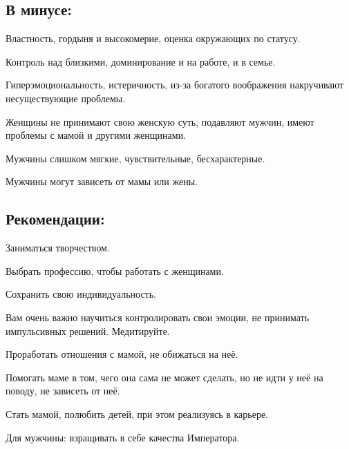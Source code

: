 \endsubsection

\subsection{В минусе:}
\item Властность, гордыня и высокомерие, оценка окружающих по статусу.                                      
\item Контроль над близкими, доминирование и на работе, и в семье.                                          
\item Гиперэмоциональность, истеричность, из-за богатого воображения накручивают несуществующие проблемы.   
\item Женщины не принимают свою женскую суть, подавляют мужчин, имеют проблемы с мамой и другими женщинами. 
\item Мужчины слишком мягкие, чувствительные, бесхарактерные.                                                
\item Мужчины могут зависеть от мамы или жены.                                                              
\endsubsection

\subsection{Рекомендации:}
\item Заниматься творчеством.                                                                                
\item Выбрать профессию, чтобы работать с женщинами.                                                        
\item Сохранить свою индивидуальность.                                                                      
\item Вам очень важно научиться контролировать свои эмоции, не принимать импульсивных решений. Медитируйте. 
\item Проработать отношения с мамой, не обижаться на неё.                                                    
\item Помогать маме в том, чего она сама не может сделать, но не идти у неё на поводу, не зависеть от неё. 
\item Стать мамой, полюбить детей, при этом реализуясь в карьере.                                        
\item Для мужчины: взращивать в себе качества Императора.                                                    
\endsubsection

